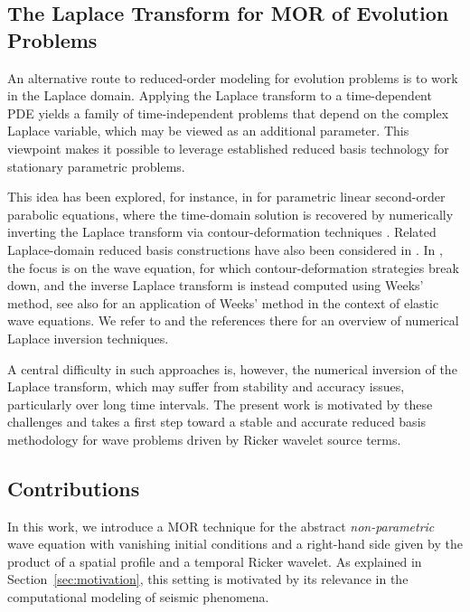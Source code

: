 \subsection{The Laplace Transform for MOR of Evolution Problems}
\label{sec:laplace_MOR}
An alternative route to reduced-order modeling for evolution problems is to work in the
Laplace domain. Applying the Laplace transform to a time-dependent PDE yields a family of
time-independent problems that depend on the complex Laplace variable, which may be viewed as
an additional parameter. This viewpoint makes it possible to leverage established reduced basis
technology for stationary parametric problems.

This idea has been explored, for instance, in \cite{guglielmi2023model} for parametric linear
second-order parabolic equations, where the time-domain solution is recovered by numerically
inverting the Laplace transform via contour-deformation techniques \cite{guglielmi2021pseudospectral}.
Related Laplace-domain reduced basis constructions have also been considered in
\cite{huynh_laplace_2011,Bigoni2020a}. 
In \cite{Bigoni2020a}, the focus is on the wave equation,
for which contour-deformation strategies break down, and the inverse Laplace transform is instead
computed using Weeks' method, see also \cite{hawkins2025model} for an application of Weeks' method in the context of elastic wave equations. We refer to \cite{kuhlman_review_2013} and the references there for an overview of numerical Laplace inversion techniques.

A central difficulty in such approaches is, however, the numerical inversion of the Laplace transform, which
may suffer from stability and accuracy issues, particularly over long time
intervals. The present work is motivated by these challenges and takes a first step toward a stable
and accurate reduced basis methodology for wave problems driven by Ricker wavelet source terms.


\subsection{Contributions}
In this work, we introduce a MOR technique for the abstract {\it non-parametric} wave equation
with vanishing initial conditions and a right-hand side given by the product of a spatial profile
and a temporal Ricker wavelet. As explained in Section~\ref{sec:motivation}, this setting is
motivated by its relevance in the computational modeling of seismic phenomena. 

